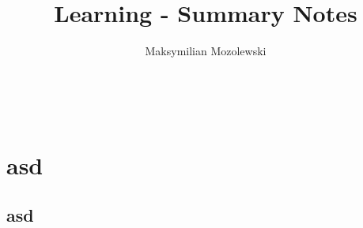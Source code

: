 \documentclass{article}
\begin{document}
\title{Learning - Summary Notes}
\author{Maksymilian Mozolewski}
\maketitle\\
\pagebreak
\tableofcontents
\pagebreak

\section{asd}
\subsection{asd}
\end{document}

